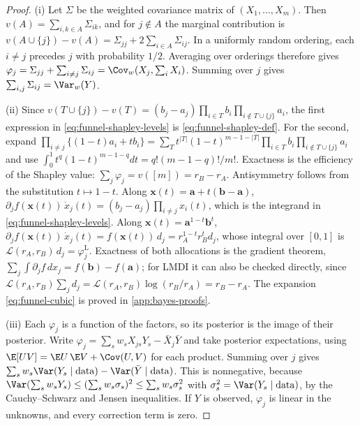 \begin{proof}
(i) Let $\Sigma$ be the weighted covariance matrix of $(X_1,\dots,X_m)$. Then $v(A)=\sum_{i,k\in A}\Sigma_{ik}$, and for $j\notin A$ the marginal contribution is $v(A\cup\{j\})-v(A)=\Sigma_{jj}+2\sum_{i\in A}\Sigma_{ij}$. In a uniformly random ordering, each $i\neq j$ precedes $j$ with probability $1/2$. Averaging over orderings therefore gives $\varphi_j=\Sigma_{jj}+\sum_{i\ne j}\Sigma_{ij}=\Cov_w(X_j,\sum_iX_i)$. Summing over $j$ gives $\sum_{i,j}\Sigma_{ij}=\Var_w(Y)$.

(ii) Since $v(T\cup\{j\})-v(T)=(b_j-a_j)\prod_{i\in T}b_i\prod_{i\notin T\cup\{j\}}a_i$, the first expression in \eqref{eq:funnel-shapley-levels} is \eqref{eq:funnel-shapley-def}. For the second, expand $\prod_{i\ne j}\{(1-t)a_i+tb_i\}=\sum_{T}t^{|T|}(1-t)^{m-1-|T|}\prod_{i\in T}b_i\prod_{i\notin T\cup\{j\}}a_i$ and use $\int_0^1t^{q}(1-t)^{m-1-q}dt=q!(m-1-q)!/m!$. Exactness is the efficiency of the Shapley value: $\sum_j\varphi_j=v([m])=r_B-r_A$. Antisymmetry follows from the substitution $t\mapsto1-t$. Along $\bm x(t)=\bm a+t(\bm b-\bm a)$, $\partial_jf(\bm x(t))\,\dot x_j(t)=(b_j-a_j)\prod_{i\ne j}x_i(t)$, which is the integrand in \eqref{eq:funnel-shapley-levels}. Along $\bm x(t)=\bm a^{1-t}\bm b^{t}$, $\partial_jf(\bm x(t))\,\dot x_j(t)=f(\bm x(t))\,d_j=r_A^{1-t}r_B^{t}d_j$, whose integral over $[0,1]$ is $\mathcal L(r_A,r_B)\,d_j=\varphi_j^{\mathrm L}$. Exactness of both allocations is the gradient theorem, $\sum_j\int\partial_jf\,dx_j=f(\bm b)-f(\bm a)$; for LMDI it can also be checked directly, since $\mathcal L(r_A,r_B)\sum_jd_j=\mathcal L(r_A,r_B)\log(r_B/r_A)=r_B-r_A$. The expansion \eqref{eq:funnel-cubic} is proved in \cref{app:bayes-proofs}.

(iii) Each $\varphi_j$ is a function of the factors, so its posterior is the image of their posterior. Write $\varphi_j=\sum_sw_sX_{js}Y_s-\bar X_j\bar Y$ and take posterior expectations, using $\E[UV]=\E U\,\E V+\Cov(U,V)$ for each product. Summing over $j$ gives $\sum_sw_s\Var(Y_s\mid\mathrm{data})-\Var(\bar Y\mid\mathrm{data})$. This is nonnegative, because $\Var(\sum_sw_sY_s)\le(\sum_sw_s\sigma_s)^2\le\sum_sw_s\sigma_s^2$ with $\sigma_s^2=\Var(Y_s\mid\mathrm{data})$, by the Cauchy--Schwarz and Jensen inequalities. If $Y$ is observed, $\varphi_j$ is linear in the unknowns, and every correction term is zero.
\end{proof}

